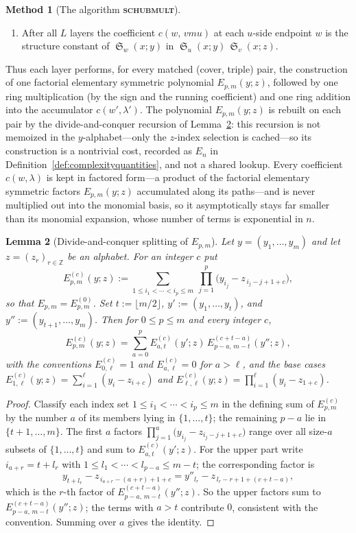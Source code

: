 \documentclass{amsart}
\newtheorem{lemma}{Lemma}[section]
\theoremstyle{definition}
\newtheorem{method}[lemma]{Method}
\theoremstyle{remark}
\numberwithin{equation}{section}
\DeclareMathOperator{\sch}{\mathfrak{S}}
\begin{document}
\begin{method}[The algorithm \textbf{\textsc{schubmult}}]
\begin{enumerate}
\item After all $L$ layers the coefficient $c(w,\,vmu)$ at each $u$-side endpoint $w$ is the structure constant of $\sch_w(x;y)$ in $\sch_u(x;y)\,\sch_v(x;z)$.
\end{enumerate}
Thus each layer performs, for every matched (cover, triple) pair, the construction of one factorial elementary symmetric polynomial $E_{p,m}(y;z)$, followed by one ring multiplication (by the sign and the running coefficient) and one ring addition into the accumulator $c(w',\lambda')$. The polynomial $E_{p,m}(y;z)$ is rebuilt on each pair by the divide-and-conquer recursion of Lemma~\ref{lemma:elemsymsplit}: this recursion is not memoized in the $y$-alphabet---only the $z$-index selection is cached---so its construction is a nontrivial cost, recorded as $E_n$ in Definition~\ref{def:complexityquantities}, and not a shared lookup. Every coefficient $c(w,\lambda)$ is kept in factored form---a product of the factorial elementary symmetric factors $E_{p,m}(y;z)$ accumulated along its paths---and is never multiplied out into the monomial basis, so it asymptotically stays far smaller than its monomial expansion, whose number of terms is exponential in $n$. 
\end{method}

\begin{lemma}[Divide-and-conquer splitting of $E_{p,m}$] \label{lemma:elemsymsplit}
Let $y=(y_1,\ldots,y_m)$ and let $z=(z_r)_{r\in\mathbb Z}$ be an alphabet. For an integer $c$ put
$$E^{(c)}_{p,m}(y;z):=\sum_{1\leq i_1<\cdots<i_p\leq m}\ \prod_{j=1}^{p}\bigl(y_{i_j}-z_{\,i_j-j+1+c}\bigr),$$
so that $E_{p,m}=E^{(0)}_{p,m}$. Set $t:=\lfloor m/2\rfloor$, $y':=(y_1,\ldots,y_t)$, and $y'':=(y_{t+1},\ldots,y_m)$. Then for $0\leq p\leq m$ and every integer $c$,
$$E^{(c)}_{p,m}(y;z)=\sum_{a=0}^{p}E^{(c)}_{a,t}(y';z)\,E^{(c+t-a)}_{p-a,\,m-t}(y'';z),$$
with the conventions $E^{(c)}_{0,\ell}=1$ and $E^{(c)}_{a,\ell}=0$ for $a>\ell$, and the base cases $E^{(c)}_{1,\ell}(y;z)=\sum_{i=1}^{\ell}(y_i-z_{i+c})$ and $E^{(c)}_{\ell,\ell}(y;z)=\prod_{i=1}^{\ell}(y_i-z_{1+c})$.
\end{lemma}
\begin{proof}
Classify each index set $1\leq i_1<\cdots<i_p\leq m$ in the defining sum of $E^{(c)}_{p,m}$ by the number $a$ of its members lying in $\{1,\ldots,t\}$; the remaining $p-a$ lie in $\{t+1,\ldots,m\}$. The first $a$ factors $\prod_{j=1}^{a}\bigl(y_{i_j}-z_{i_j-j+1+c}\bigr)$ range over all size-$a$ subsets of $\{1,\ldots,t\}$ and sum to $E^{(c)}_{a,t}(y';z)$. For the upper part write $i_{a+r}=t+l_r$ with $1\leq l_1<\cdots<l_{p-a}\leq m-t$; the corresponding factor is
$$y_{t+l_r}-z_{\,i_{a+r}-(a+r)+1+c}=y''_{l_r}-z_{\,l_r-r+1+(c+t-a)},$$
which is the $r$-th factor of $E^{(c+t-a)}_{p-a,\,m-t}(y'';z)$. So the upper factors sum to $E^{(c+t-a)}_{p-a,\,m-t}(y'';z)$; the terms with $a>t$ contribute $0$, consistent with the convention. Summing over $a$ gives the identity.
\end{proof}
\end{document}
